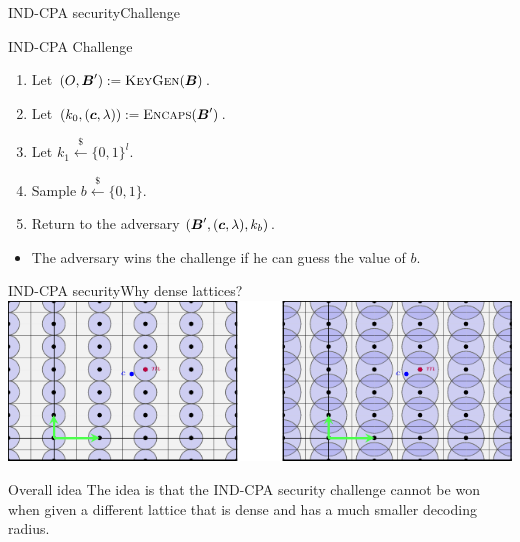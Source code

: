 \documentclass[10pt]{beamer}
\begin{document}
\begin{frame}{IND-CPA security}{Challenge}
				\begin{definition} \scriptsize
				\end{definition}

				\begin{block}{IND-CPA Challenge}
								\begin{enumerate}
												\item Let $(O, \boldsymbol{B}') := \textsc{KeyGen}(\boldsymbol{B})$.
												\item Let $(k_{0}, (\boldsymbol{c}, \lambda)) := \textsc{Encaps}(\boldsymbol{B}')$.
												\item Let $k_{1} \xleftarrow{\$} \{0, 1\}^{l}$.
												\item Sample $b \xleftarrow{\$} \{0, 1\}$.
												\item Return to the adversary $(\boldsymbol{B}', (\boldsymbol{c}, \lambda), k_{b})$.
								\end{enumerate}

								\begin{itemize}
												\item The adversary wins the challenge if he can guess the value of $b$.
								\end{itemize}
				\end{block}
\end{frame}

\begin{frame}{IND-CPA security}{Why dense lattices?}
				\includegraphics{figures/not-dense-lattice.pdf}

				\begin{block}{Overall idea}
								The idea is that the IND-CPA security challenge cannot be won when given a different lattice that is dense and has a much smaller decoding radius.
				\end{block}
\end{frame}
\end{document}
